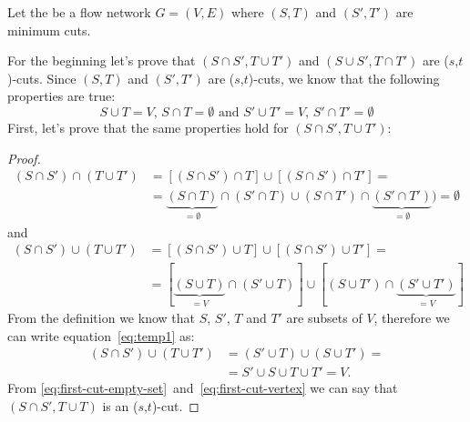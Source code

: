 
\renewcommand{\u}{\cup}
\newcommand{\n}{\cap}
\newcommand{\stcut}{($s$,$t$)-cut}
\newcommand{\stcuts}{($s$,$t$)-cuts}
\newcommand{\refeq}[1]{(\ref{#1})}


Let the be a flow network $G=(V,E)$ where $(S,T)$ and $(S',T')$ are minimum cuts.

For the beginning let's prove that $(S \n S', T \u T')$ and $(S \u S', T \n T')$ are \stcuts{}.
Since $(S,T)$ and $(S',T')$ are \stcuts{}, we know that the following properties are true:
\begin{equation}
S \u T = V \text{, } S \n T = \emptyset \text{ and }
S' \u T' = V \text{, } S' \n T' = \emptyset
\label{eq:start}
\end{equation}
First, let's prove that the same properties hold for $(S \n S', T \u T')$:
\begin{proof}
\begin{align}
(S \n S') \n (T \u T') &= [(S \n S') \n T] \u [(S \n S') \n T'] = \nonumber \\ 
&= \underbrace{(S \n T)}_{=\emptyset} \n (S' \n T) \u (S \n T') \n \underbrace{(S' \n T')}_{=\emptyset}) = \emptyset \label{eq:first-cut-empty-set}
\end{align}
and
\begin{align}
(S \n S') \u (T \u T') &= [(S \n S') \u T] \u [(S \n S') \u T'] = \nonumber \\
&= [\underbrace{(S \u T)}_{=V} \n (S' \u T)] \u [(S \u T') \n \underbrace{(S' \u T')}_{=V}] \label{eq:temp1}
\end{align}
From the definition we know that $S$, $S'$, $T$ and $T'$ are subsets of $V$, therefore we can write equation~\eqref{eq:temp1} as:
\begin{align}
(S \n S') \u (T \u T') &= (S' \u T) \u (S \u T') = \nonumber \\
&= S' \u S \u T \u T' = V. \label{eq:first-cut-vertex}
\end{align}
From \eqref{eq:first-cut-empty-set}~and~\eqref{eq:first-cut-vertex} we can say that $(S \n S', T \u T)$ is an \stcut{}.
\end{proof}

